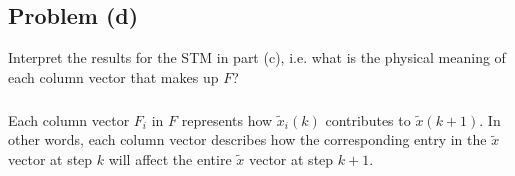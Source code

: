 \documentclass[11pt]{article}
\begin{document}
\subsection*{Problem (d)}
Interpret the results for the STM in part (c), i.e. what is the physical meaning of each column vector that makes up $F$?

\subparagraph{}
Each column vector $F_i$ in $F$ represents how $\tilde{x}_i(k)$ contributes to $\tilde{x}(k+1)$. In other words, each column vector describes how the corresponding entry in the $\tilde{x}$ vector at step $k$ will affect the entire $\tilde{x}$ vector at step $k+1$.
\end{document}
